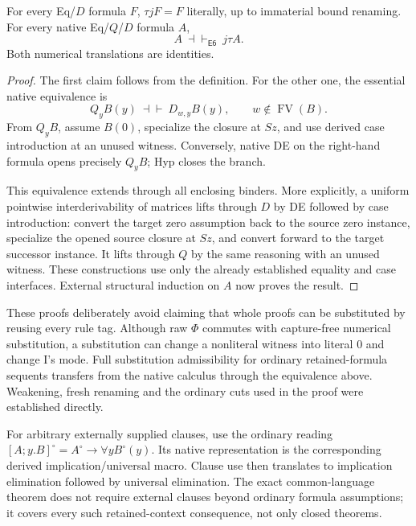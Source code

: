 \begin{theorem}
\label{thm:ce5-composites}
For every Eq/$D$ formula $F$, $\tau jF=F$ literally, up to immaterial
bound renaming. For every native Eq/$Q$/$D$ formula $A$,
\[
 A\ \dashv\vdash_{\mathsf{E6}}\ j\tau A.
\]
Both numerical translations are identities.
\end{theorem}
\begin{proof}
The first claim follows from the definition. For the other one, the
essential native equivalence is
\[
 Q_yB(y)\ \dashv\vdash\
 D_{w,y}B(y),\qquad w\notin\operatorname{FV}(B).
\]
From $Q_yB$, assume $B(0)$, specialize the closure at $Sz$, and use
derived case introduction at an unused witness. Conversely, native DE
on the right-hand formula opens precisely $Q_yB$; Hyp closes the branch.

This equivalence extends through all enclosing binders. More
explicitly, a uniform pointwise interderivability of matrices lifts
through $D$ by DE followed by case introduction: convert the target
zero assumption back to the source zero instance, specialize the
opened source closure at $Sz$, and convert forward to the target
successor instance. It lifts through $Q$ by the same reasoning with
an unused witness. These constructions use only the already
established equality and case interfaces. External structural induction
on $A$ now proves the result.
\end{proof}

These proofs deliberately avoid claiming that whole proofs can be
substituted by reusing every rule tag. Although raw $\Phi$ commutes
with capture-free numerical substitution, a substitution can change
a nonliteral witness into literal $0$ and change I's mode. Full
substitution admissibility for ordinary retained-formula sequents
transfers from the native calculus through the equivalence above.
Weakening, fresh renaming and the ordinary cuts
used in the proof were established directly.

For arbitrary externally supplied clauses, use the ordinary reading
$[A;y.B]^\circ=A^\circ\to\forall yB^\circ(y)$. Its native representation
is the corresponding derived implication/universal macro. Clause use
then translates to implication elimination followed by universal
elimination. The exact common-language theorem does not require
external clauses beyond ordinary formula assumptions; it covers every
such retained-context consequence, not only closed theorems.

